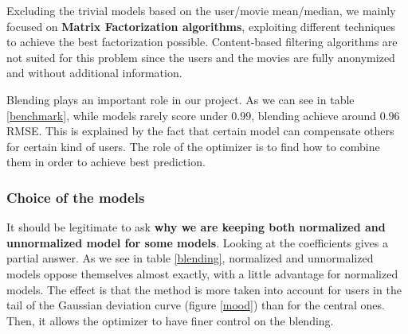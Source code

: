 \documentclass[10pt,conference,compsocconf]{IEEEtran}
\begin{document}
Excluding the trivial models based on the user/movie mean/median, we mainly focused on \textbf{Matrix
Factorization algorithms}, exploiting different techniques to achieve the best factorization
possible. Content-based filtering algorithms are not suited for this problem since the users and the
movies are fully anonymized and without additional information.

Blending plays an important role in our project. As we can see in table \ref{benchmark}, while models rarely score under $0.99$, blending achieve around $0.96$ RMSE. This is explained by the fact that certain model can compensate others for certain kind of users. The role of the optimizer is to find how to combine them in order to achieve best prediction.


\subsubsection{Choice of the models}

It should be legitimate to ask \textbf{why we are keeping both normalized and unnormalized model for
some models}. Looking at the coefficients gives a partial answer. As we see in table \ref{blending}, normalized and unnormalized models oppose themselves almost exactly, with a little advantage for normalized models. The effect is that the method is more taken into account for users in the tail of the Gaussian deviation curve (figure \ref{mood}) than for the central ones. Then, it allows the optimizer to have finer control on the blending.
\end{document}
